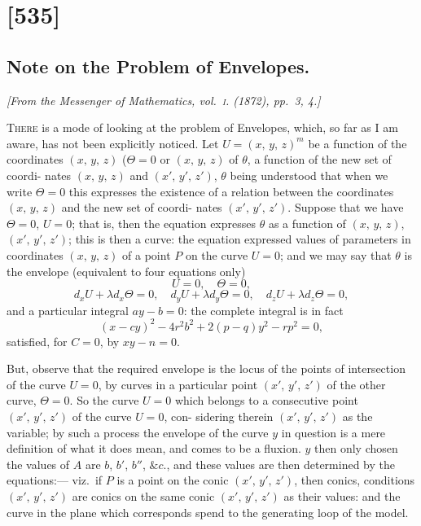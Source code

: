 \documentclass[11pt,a4paper]{article}
\theoremstyle{plain}
\theoremstyle{definition}
\begin{document}
\clearpage

\section{[535]}
\subsection{Note on the Problem of Envelopes.}

\begin{center}
\textit{[From the Messenger of Mathematics, vol.~\textsc{i}. (1872), pp.~3, 4.]}
\end{center}

\noindent\textsc{There} is a mode of looking at the problem of Envelopes, which, so far as I am
aware, has not been explicitly noticed. Let $U = (x,\,y,\,z)^m$ be a function of the
coordinates $(x,\,y,\,z)$ ($\Theta=0$ or $(x,\,y,\,z)$ of $\theta$, a function of the new set of coordi-
nates $(x,\,y,\,z)$ and $(x',\,y',\,z')$, $\theta$ being understood that when we write $\Theta=0$ this expresses
the existence of a relation between the coordinates $(x,\,y,\,z)$ and the new set of coordi-
nates $(x',\,y',\,z')$. Suppose that we have $\Theta=0$, $U = 0$; that is, then the
equation expresses $\theta$ as a function of $(x,\,y,\,z)$, $(x',\,y',\,z')$; this is then a curve: the
equation expressed values of parameters in coordinates $(x,\,y,\,z)$ of a point $P$ on the
curve $U=0$; and we may say that $\theta$ is the envelope (equivalent to four equations
only)
\[
U = 0, \quad \Theta = 0,
\]
\[
d_x U + \lambda d_x \Theta = 0, \quad d_y U + \lambda d_y \Theta = 0, \quad d_z U + \lambda d_z \Theta = 0,
\]
and a particular integral $a y - b = 0$: the complete integral is in fact
\[
(x - cy)^2 - 4r^2 b^2 + 2(p - q)y^2 - rp^2 = 0,
\]
satisfied, for $C = 0$, by $xy - n = 0$.

But, observe that the required envelope is the locus of the points of intersection
of the curve $U=0$, by curves in a particular point $(x',\,y',\,z')$ of the other curve, $\Theta=0$. So
the curve $U=0$ which belongs to a consecutive point $(x',\,y',\,z')$ of the curve $U=0$, con-
sidering therein $(x',\,y',\,z')$ as the variable; by such a process the envelope of the curve
$y$ in question is a mere definition of what it does mean, and comes to be a fluxion.
$y$ then only chosen the values of $A$ are $b$, $b'$, $b''$, $\&c.$, and these values are then determined
by the equations:--- viz.\ if $P$ is a point on the conic $(x',\,y',\,z')$, then conics, conditions
$(x',\,y',\,z')$ are conics on the same conic $(x',\,y',\,z')$ as their values: and the curve in the plane which corresponds
spend to the generating loop of the model.
\end{document}
